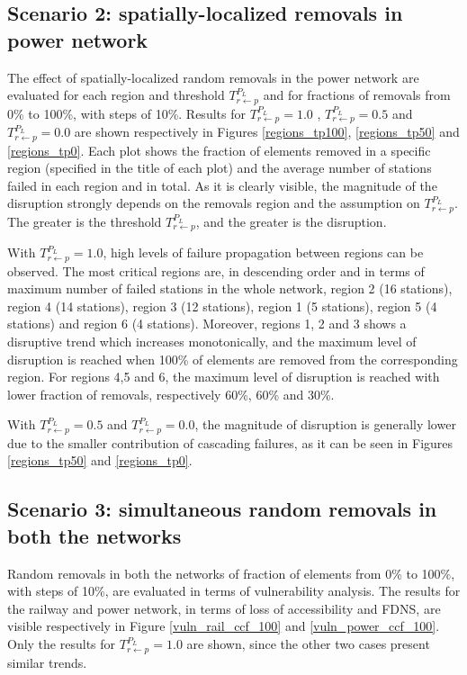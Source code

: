 \documentclass[review]{elsarticle}
\begin{document}
\subsection{Scenario 2: spatially-localized removals in power network}
The effect of spatially-localized random removals in the power network are evaluated for each region and threshold $T_{r \leftarrow p}^{P_L}$ and for fractions of removals from 0\% to 100\%, with steps of 10\%. Results for $T_{r \leftarrow p}^{P_L}=1.0$ , $T_{r \leftarrow p}^{P_L}=0.5$ and $T_{r \leftarrow p}^{P_L}=0.0$ are shown respectively in Figures \ref{regions_tp100}, \ref{regions_tp50} and \ref{regions_tp0}. Each plot shows the fraction of elements removed in a specific region (specified in the title of each plot) and the average number of stations failed in each region and in total. As it is clearly visible, the magnitude of the disruption strongly depends on the removals region and the assumption on $T_{r \leftarrow p}^{P_L}$. The greater is the threshold $T_{r \leftarrow p}^{P_L}$, and the greater is the disruption.

With $T_{r \leftarrow p}^{P_L}=1.0$, high levels of failure propagation between regions can be observed. The most critical regions are, in descending order and in terms of maximum number of failed stations in the whole network, region 2 (16 stations), region 4 (14 stations), region 3 (12 stations), region 1 (5 stations), region 5 (4 stations) and region 6 (4 stations). Moreover, regions 1, 2 and 3 shows a disruptive trend which increases monotonically, and the maximum level of disruption is reached when 100\% of elements are removed from the corresponding region. For regions 4,5 and 6, the maximum level of disruption is reached with lower fraction of removals, respectively 60\%, 60\% and 30\%.

With $T_{r \leftarrow p}^{P_L}=0.5$ and $T_{r \leftarrow p}^{P_L}=0.0$, the magnitude of disruption is generally lower due to the smaller contribution of cascading failures, as it can be seen in Figures \ref{regions_tp50} and \ref{regions_tp0}.

\subsection{Scenario 3: simultaneous random removals in both the networks}
Random removals in both the networks of fraction of elements from 0\% to 100\%, with steps of 10\%, are evaluated in terms of vulnerability analysis. The results for the railway and power network, in terms of loss of accessibility and FDNS, are visible respectively in Figure \ref{vuln_rail_ccf_100} and \ref{vuln_power_ccf_100}. Only the results for $T_{r \leftarrow p}^{P_L}=1.0$ are shown, since the other two cases present similar trends.
\end{document}
